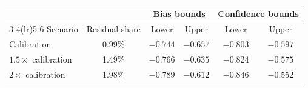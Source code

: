\begin{tabular}{lccccc}
\toprule
 & & \multicolumn{2}{c}{Bias bounds} & \multicolumn{2}{c}{Confidence bounds}\\
\cmidrule(lr){3-4}\cmidrule(lr){5-6}
Scenario & Residual share & Lower & Upper & Lower & Upper\\
\midrule
Calibration & 0.99\% & $-0.744$ & $-0.657$ & $-0.803$ & $-0.597$\\
$1.5\times$ calibration & 1.49\% & $-0.766$ & $-0.635$ & $-0.824$ & $-0.575$\\
$2\times$ calibration & 1.98\% & $-0.789$ & $-0.612$ & $-0.846$ & $-0.552$\\
\bottomrule
\end{tabular}
